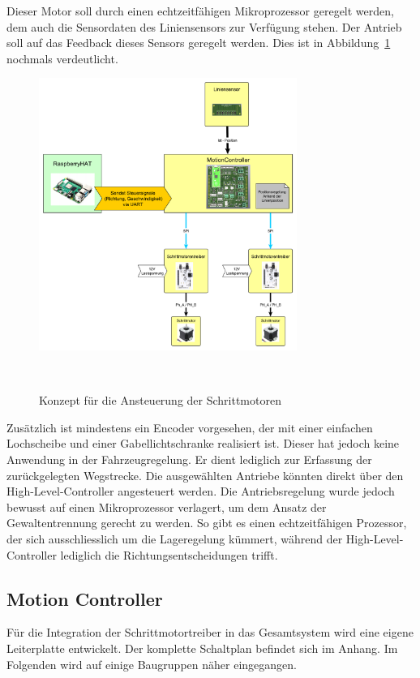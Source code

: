 \documentclass[main.  tex]{subfiles} %
\begin{document}
Dieser Motor soll durch einen echtzeitfähigen Mikroprozessor geregelt werden,
dem auch die Sensordaten des Liniensensors zur Verfügung stehen. Der Antrieb
soll auf das Feedback dieses Sensors geregelt werden. Dies ist in
Abbildung~\ref{fig:RTC_Trinamic_Konzept} nochmals verdeutlicht.
\begin{figure}[H]
    \centering
    \includegraphics[width=0.75\textwidth]{./fig_Antriebe/Konzept_Motoransteuerung.pdf}
    \caption{Konzept für die Ansteuerung der Schrittmotoren}~\label{fig:RTC_Trinamic_Konzept}
\end{figure}

Zusätzlich ist mindestens ein Encoder vorgesehen, der mit einer einfachen
Lochscheibe und einer Gabellichtschranke realisiert ist. Dieser hat jedoch
keine Anwendung in der Fahrzeugregelung. Er dient lediglich zur Erfassung der
zurückgelegten Wegstrecke. Die ausgewählten Antriebe könnten direkt über den
High-Level-Controller angesteuert werden. Die Antriebsregelung wurde jedoch
bewusst auf einen Mikroprozessor verlagert, um dem Ansatz der Gewaltentrennung
gerecht zu werden. So gibt es einen echtzeitfähigen Prozessor, der sich
ausschliesslich um die Lageregelung kümmert, während der High-Level-Controller
lediglich die Richtungsentscheidungen trifft.

\subsection*{Motion Controller} %

Für die Integration der Schrittmotortreiber in das Gesamtsystem wird eine
eigene Leiterplatte entwickelt. Der komplette Schaltplan befindet sich im
Anhang. Im Folgenden wird auf einige Baugruppen näher eingegangen.
\end{document}
